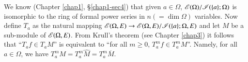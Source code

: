 \begin{remark}\label{chap2-rem1.8}
We know (Chapter \ref{chap1}, \S\ref{chap1-sec4}) that given $a\in \Omega$, $\mathscr{E}(\Omega)/\mathscr{I}(\{a\};\Omega)$ is isomorphic to the ring of formal power series in $n(=\dim \Omega)$ variables. Now define $T_{a}$ as the natural mapping $\mathscr{E}(\Omega,E)\to \mathscr{E}(\Omega,E)/\mathscr{I}(\{a\};\Omega,E)$ and let $M$ be a sub-module of $\mathscr{E}(\Omega,E)$. From Krull's theorem (see Chapter \ref{chap3}) it follows that ``$T_{a}f\in T_{a}M$'' is equivalent to ``for all $m\geq 0$, $T^{m}_{a}f\in T^{m}_{a}M$''. Namely, for all $a\in \Omega$, we have $T^{m}_{a}M=T^{m}_{a}\widehat{M}=T^{m}_{a}\overline{M}$.
\end{remark}

